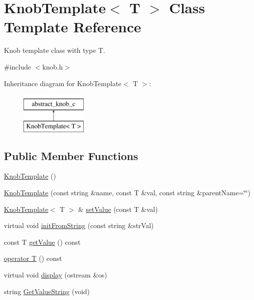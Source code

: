 \hypertarget{classKnobTemplate}{
\section{KnobTemplate$<$ T $>$ Class Template Reference}
\label{classKnobTemplate}
}


Knob template class with type T.  




{\ttfamily \#include $<$knob.h$>$}

Inheritance diagram for KnobTemplate$<$ T $>$:\begin{figure}[H]
\begin{center}
\leavevmode
\includegraphics[height=2.000000cm]{classKnobTemplate}
\end{center}
\end{figure}
\subsection*{Public Member Functions}
\begin{DoxyCompactItemize}
\item 
\hyperlink{classKnobTemplate_aaddb7933b87960bb107b664c64b9be35}{KnobTemplate} ()
\item 
\hyperlink{classKnobTemplate_abbccdaab4475aa203cc72114e6c755c9}{KnobTemplate} (const string \&name, const T \&val, const string \&parentName=\char`\"{}\char`\"{})
\item 
\hyperlink{classKnobTemplate}{KnobTemplate}$<$ T $>$ \& \hyperlink{classKnobTemplate_a2ca50f6173b1b904310be277eb0bb4c1}{setValue} (const T \&val)
\item 
virtual void \hyperlink{classKnobTemplate_a56f3e765c947ac3e63f759d7b3188e42}{initFromString} (const string \&strVal)
\item 
const T \hyperlink{classKnobTemplate_a7191e4a940e968e7a1a41d606802300a}{getValue} () const 
\item 
\hyperlink{classKnobTemplate_aa23d5fa0b0f63756f03690d650bf697b}{operator T} () const 
\item 
virtual void \hyperlink{classKnobTemplate_af9a940a1d590ad63fdef381388935273}{display} (ostream \&os)
\item 
string \hyperlink{classKnobTemplate_aded197b0d716077801868dd111e7d083}{GetValueString} (void)
\end{DoxyCompactItemize}
